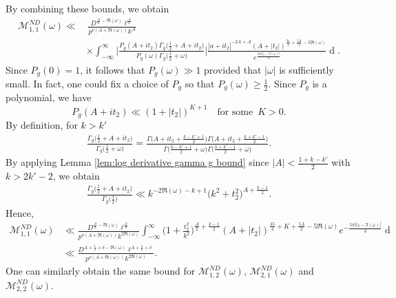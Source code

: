 \documentclass[12pt]{amsart}
\theoremstyle{plain}
\theoremstyle{definition}
\begin{document}
      By combining these bounds, we obtain
 \begin{align*}
     \mathcal{M}_{1,1}^{ND}(\omega)
    \ll  &\,  \frac{D^{\frac{\mathcal{A}}{2}-\Re(\omega)} \ell^{\frac{\mathcal{A}}{2}}  }{p^{\nu(A+\Re(\omega))} k^{\mathcal{A}}}  \
    \\
    &\times \int_{-\infty}^\infty 
     \bigg| \frac{ P_g(A+it_2) \Gamma_g\big(\frac12+A+it_2\big) }{P_g(\omega)\Gamma_g\big(\frac12+\omega\big)} \bigg|
     \frac{ |a+it_2|^{-2A+\mathcal{A}}(A+|t_2|)^{\frac{31}{4}+\frac{5A}{2}-5\Re(\omega)} }
      {e^{\frac{5\pi |t_2-\Im(\omega)|}{4}}}     \mathop{dt_2}.
    \end{align*}
Since $P_g(0)=1$, it follows that $P_g(\omega)\gg 1$ provided that $|\omega|$ is sufficiently small. In fact, one could fix a choice of $P_g$ so that $P_g(\omega)\geq \frac12$. Since $P_g$ is a polynomial, we have 
     \[
    P_g(A+it_2) \ll (1+|t_2|)^{K+1} \quad \text{for some }\, K>0.
    \]
By definition, for $k>k'$
    \begin{align*}
    \frac{\Gamma_g\big(\frac12+A+it_2\big) }{\Gamma_g\big(\frac12+\omega\big) }
    = \frac{\Gamma\big(A+it_2+\frac{k-k'+1}{2}\big)
    \Gamma\big(A+it_2+\frac{k+k'-1}{2}\big) }{\Gamma\big(\frac{k-k'+1}{2}+\omega\big)
    \Gamma\big(\frac{k+k'-1}{2}+\omega\big) }.
    \end{align*}
By applying Lemma \ref{lem:log derivative gamma g bound} since $|A| < \frac{1+k-k'}{2}$ with $k>2k'-2$, we obtain
    \begin{align*}
    \frac{\Gamma_g\big(\frac12+A+it_2\big) }{\Gamma_g\big(\frac12\big) }
    \ll 
   k^{-2\Re(\omega)-k+1} \big(k^2+t_2^2\big)^{A+\frac{k-1}{2}}.
    \end{align*}
Hence,
\begin{align}\label{eqn:bound-1st-moment-nd}
     \mathcal{M}_{1,1}^{ND}(\omega)
   & \ll   \frac{D^{\frac{\mathcal{A}}{2}-\Re(\omega)} \ell^{\frac{\mathcal{A}}2}}{p^{\nu(A+\Re(\omega))} k^{2\Re(\omega)}}  
    \int_{-\infty}^\infty 
     \Big(1+\frac{t_2^2}{k^2}\Big)^{\frac{\mathcal{A}}{2}+\frac{k-1}{2}}
      (A+|t_2|)^{\frac{35}{4}+K+\frac{5A}{2}-5\Re(\omega)} e^{-\frac{5\pi |t_2-\Im(\omega)|}{4}} \mathop{dt_2}
    \nonumber  \\&\ll  \frac{D^{A+\frac12+\delta-\Re(\omega)} \ell^{A+\frac12+\delta} }{p^{\nu(A+\Re(\omega))} k^{2\Re(\omega)}} .
    \end{align}
One can similarly obtain the same bound for $ \mathcal{M}_{1,2}^{ND}(\omega)$, $ \mathcal{M}_{2,1}^{ND}(\omega)$ and $ \mathcal{M}_{2,2}^{ND}(\omega).$
\end{document}
